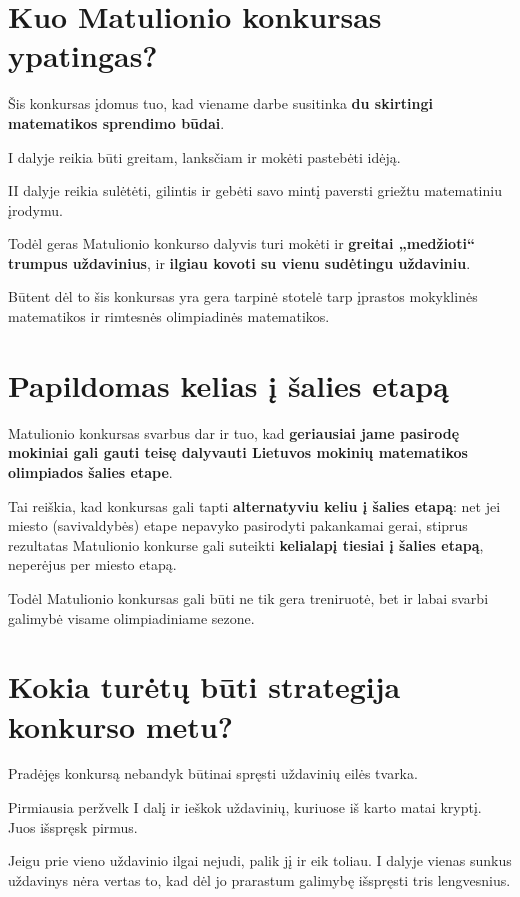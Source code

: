 \documentclass[11pt,a4paper]{article}
\begin{document}
\section{Kuo Matulionio konkursas ypatingas?}

Šis konkursas įdomus tuo, kad viename darbe susitinka \textbf{du skirtingi matematikos sprendimo būdai}.

I dalyje reikia būti greitam, lanksčiam ir mokėti pastebėti idėją.

II dalyje reikia sulėtėti, gilintis ir gebėti savo mintį paversti griežtu matematiniu įrodymu.

Todėl geras Matulionio konkurso dalyvis turi mokėti ir \textbf{greitai „medžioti“ trumpus uždavinius}, ir \textbf{ilgiau kovoti su vienu sudėtingu uždaviniu}.

Būtent dėl to šis konkursas yra gera tarpinė stotelė tarp įprastos mokyklinės matematikos ir rimtesnės olimpiadinės matematikos.

\section{Papildomas kelias į šalies etapą}

Matulionio konkursas svarbus dar ir tuo, kad \textbf{geriausiai jame pasirodę mokiniai gali gauti teisę dalyvauti Lietuvos mokinių matematikos olimpiados šalies etape}.

Tai reiškia, kad konkursas gali tapti \textbf{alternatyviu keliu į šalies etapą}: net jei miesto (savivaldybės) etape nepavyko pasirodyti pakankamai gerai, stiprus rezultatas Matulionio konkurse gali suteikti \textbf{kelialapį tiesiai į šalies etapą}, neperėjus per miesto etapą.

Todėl Matulionio konkursas gali būti ne tik gera treniruotė, bet ir labai svarbi galimybė visame olimpiadiniame sezone.

\section{Kokia turėtų būti strategija konkurso metu?}

Pradėjęs konkursą nebandyk būtinai spręsti uždavinių eilės tvarka.

Pirmiausia peržvelk I dalį ir ieškok uždavinių, kuriuose iš karto matai kryptį. Juos išspręsk pirmus.

Jeigu prie vieno uždavinio ilgai nejudi, palik jį ir eik toliau. I dalyje vienas sunkus uždavinys nėra vertas to, kad dėl jo prarastum galimybę išspręsti tris lengvesnius.
\end{document}
